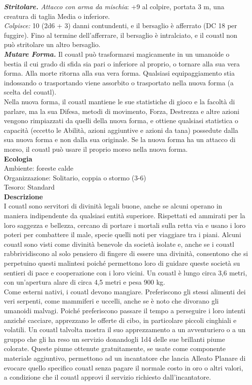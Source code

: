 \begin{multicols}{2}
\emph{\textbf{Stritolare.} Attacco con arma da mischia}: +9 al colpire, portata 3 m, una creatura di taglia Media o inferiore.\\
\emph{Colpisce:} 10 (2d6 + 3) danni contundenti, e il bersaglio è afferrato (DC  18 per fuggire). Fino al termine dell'afferrare, il bersaglio è intralciato, e il couatl non può stritolare un altro bersaglio.\\
\emph{\textbf{Mutare Forma.}} Il couatl può trasformarsi magicamente in un umanoide o bestia il cui grado di sfida sia pari o inferiore al proprio, o tornare alla sua vera forma. Alla morte ritorna alla sua vera forma. Qualsiasi equipaggiamento stia indossando o trasportando viene assorbito o trasportato nella nuova forma (a scelta del couatl).\\
Nella nuova forma, il couatl mantiene le sue statistiche di gioco e la facoltà di parlare, ma la sua Difesa, metodi di movimento, Forza, Destrezza e altre azioni vengono rimpiazzati da quelli della nuova forma, e ottiene qualsiasi statistica o capacità (eccetto le Abilità, azioni aggiuntive e azioni da tana) possedute dalla sua nuova forma e non dalla sua originale. Se la nuova forma ha un attacco di morso, il couatl può usare il proprio morso nella nuova forma.\\
\textbf{Ecologia}\\
Ambiente: foreste calde\\
Organizzazione: Solitario, coppia o stormo (3-6)\\
Tesoro: Standard\\
\textbf{Descrizione}\\
I couatl sono servitori di divinità legali buone, anche se alcuni operano in maniera indipendente da qualsiasi entità superiore. Rispettati ed ammirati per la loro saggezza e bellezza, cercano di portare i mortali sulla retta via e usano i loro poteri per combattere il male, specie quelli noti per viaggiare tra i piani. Alcuni couatl sono visti come divinità benevole da società isolate e, anche se i couatl rabbrividiscono al solo pensiero di fingere di essere una divinità, consentono che si perpetuino questi malintesi poiché permettono loro di guidare queste società su sentieri di pace e cooperazione con i loro vicini. Un couatl è lungo circa 3,6 metri, con un’apertura alare di circa 4,5 metri e pesa 900 kg.\\
Come esterni nativi, i couatl devono mangiare. Preferiscono gli stessi alimenti dei veri serpenti, come mammiferi e uccelli, anche se è noto che divorano gli umanoidi malvagi. Poiché preferiscono passare il tempo a perseguire i loro intenti anziché cacciare, apprezzano le offerte di cibo, in particolare piccoli cinghiali e volatili. Un couatl talvolta mostra il suo apprezzamento a un avventuriero o a un gruppo che gli ha reso un servizio donandogli 1d4 delle sue brillanti piume colorate. Queste piume ottenute gratuitamente, se usate come componente materiale aggiuntivo, permettono ad un incantatore che lancia Alleato Planare di evocare quello specifico couatl senza pagare il normale costo in oro o altri valori, a condizione che il couatl approvi il servizio richiesto dall'incantatore.\\


\end{multicols}
